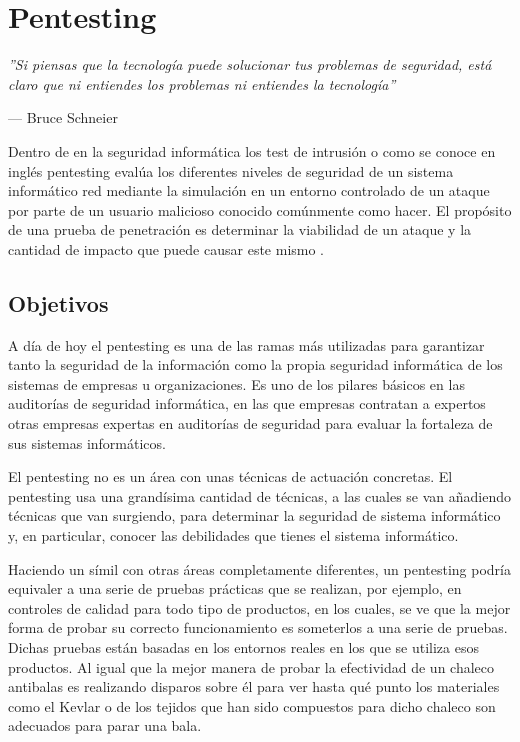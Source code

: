 \chapter{Pentesting}

\epigraph{\textit{''Si piensas que la tecnología puede solucionar tus problemas de seguridad, está claro que ni entiendes los problemas ni entiendes la tecnología''}}{--- Bruce Schneier}

Dentro de en la seguridad informática los test de intrusión o como se conoce en inglés pentesting evalúa los diferentes niveles de seguridad de un sistema informático red mediante la simulación en un entorno controlado de un ataque por parte de un usuario malicioso conocido comúnmente como hacer\cite{pentesting-kali}. El propósito de una prueba de penetración es determinar la viabilidad de un ataque y la cantidad de impacto que puede causar este mismo .

\section{Objetivos}

A día de hoy el pentesting es una de las ramas más utilizadas para garantizar tanto la seguridad de la información como la propia seguridad informática de los sistemas de empresas u organizaciones. Es uno de los pilares básicos en las auditorías de seguridad informática, en las que empresas contratan a expertos otras empresas expertas en auditorías de seguridad para evaluar la fortaleza de sus sistemas informáticos.

El pentesting no es un área con unas técnicas de actuación concretas. El pentesting usa una grandísima cantidad de técnicas, a las cuales se van añadiendo técnicas que van surgiendo, para determinar la seguridad de sistema informático y, en particular, conocer las debilidades que tienes el sistema informático.

Haciendo un símil con otras áreas completamente diferentes, un pentesting podría equivaler a una serie de pruebas prácticas que se realizan, por ejemplo, en controles de calidad para todo tipo de productos, en los cuales, se ve que la mejor forma de probar su correcto funcionamiento es someterlos a una serie de pruebas. Dichas pruebas están basadas en los entornos reales en los que se utiliza esos productos. Al igual que la mejor manera de probar la efectividad de un chaleco antibalas es realizando disparos sobre él para ver hasta qué punto los materiales como el Kevlar o de los tejidos que han sido compuestos para dicho chaleco son adecuados para parar una bala.

